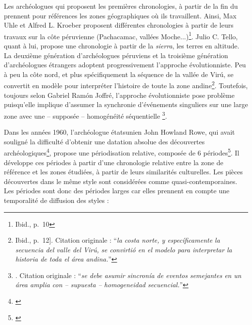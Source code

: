 Les archéologues qui proposent les premières chronologies, à partir de la fin du  prennent pour références les zones géographiques où ils travaillent. Ainsi, Max Uhle et Alfred L. Kroeber proposent différentes chronologies à partir de leurs travaux sur la côte péruvienne (Pachacamac, vallées Moche...)\footnote{Ibid., p.~10}. Julio C. Tello, quant à lui, propose une chronologie à partir de la \textit{sierra}, les terres en altitude.
La deuxième génération d'archéologues péruviens et la troisième génération d'archéologues étrangers adoptent progressivement l'approche évolutionniste. Peu à peu \og la côte nord, et plus spécifiquement la séquence de la vallée de Virú, se convertit en modèle pour interpréter l'histoire de toute la zone andine\footnote{Ibid., p.~12]. Citation originale : \textquotedblleft \textit{la costa norte, y específicamente la secuencia del valle del Virú, se convirtió en el modelo para interpretar la historia de toda el área andina.}\textquotedblright}. \fg \:Toutefois, toujours selon Gabriel Ramón Joffré, l'approche évolutionniste pose problème puisqu'elle implique \og d'assumer la synchronie d'événements singuliers sur une large zone avec une -- supposée -- homogénéité séquentielle \footnote{\cite[p.~13]{ramonjoffrePeriodificacionArqueologiaPeruana2005}. Citation originale : \textquotedblleft \textit{se debe asumir sincronía de eventos semejantes en un área amplia con -- supuesta -- homogeneidad secuencial.}\textquotedblright}. \fg \: 

Dans les années 1960, l'archéologue étatsunien John Howland Rowe, qui avait souligné la difficulté d'obtenir une datation absolue des découvertes archéologiques\footnote{\cite{roweAbsoluteChronologyAndean1945}}, propose une périodisation relative, composée de 6 périodes\footnote{\cite[p.~627]{roweCulturalUnityDiversification1960}}. Il développe ces périodes à partir d'une chronologie relative entre la zone de référence et les zones étudiées, à partir de leurs similarités culturelles. Les pièces découvertes dans le même style sont considérées comme quasi-contemporaines. Les périodes sont donc des périodes larges car elles prennent en compte une temporalité de diffusion des styles : 

